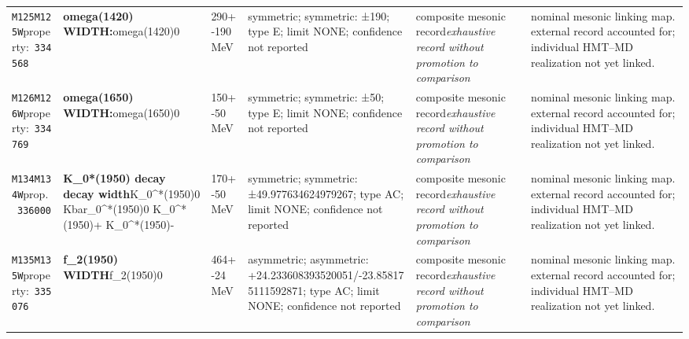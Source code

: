 \begin{landscape}
\begin{longtable}{L{1.85cm}L{4.45cm}L{2.35cm}L{4.05cm}L{3.35cm}L{7.15cm}}
\texttt{M125}\newline \texttt{M125W}\newline property:\ \texttt{334568} & \textbf{omega(1420) WIDTH:}\newline omega(1420)0 & 290+-190\,MeV & symmetric; symmetric: ±190; type E; limit NONE; confidence not reported & composite mesonic record\newline \emph{exhaustive record without promotion to comparison} & nominal mesonic linking map. external record accounted for; individual HMT--MD realization not yet linked. \\
\texttt{M126}\newline \texttt{M126W}\newline property:\ \texttt{334769} & \textbf{omega(1650) WIDTH:}\newline omega(1650)0 & 150+-50\,MeV & symmetric; symmetric: ±50; type E; limit NONE; confidence not reported & composite mesonic record\newline \emph{exhaustive record without promotion to comparison} & nominal mesonic linking map. external record accounted for; individual HMT--MD realization not yet linked. \\
\texttt{M134}\newline \texttt{M134W}\newline prop.\ \texttt{336000} & \textbf{K\_\allowbreak{}0*(1950) decay decay width}\newline K\_\allowbreak{}0\textasciicircum{}*(1950)0 \textbar{}\allowbreak{} Kbar\_\allowbreak{}0\textasciicircum{}*(1950)0 \textbar{}\allowbreak{} K\_\allowbreak{}0\textasciicircum{}*(1950)+ \textbar{}\allowbreak{} K\_\allowbreak{}0\textasciicircum{}*(1950)- & 170+-50\,MeV & symmetric; symmetric: ±49.977634624979267; type AC; limit NONE; confidence not reported & composite mesonic record\newline \emph{exhaustive record without promotion to comparison} & nominal mesonic linking map. external record accounted for; individual HMT--MD realization not yet linked. \\
\texttt{M135}\newline \texttt{M135W}\newline property:\ \texttt{335076} & \textbf{f\_\allowbreak{}2(1950) WIDTH}\newline f\_\allowbreak{}2(1950)0 & 464+-24\,MeV & asymmetric; asymmetric: +24.233608393520051/-23.858175111592871; type AC; limit NONE; confidence not reported & composite mesonic record\newline \emph{exhaustive record without promotion to comparison} & nominal mesonic linking map. external record accounted for; individual HMT--MD realization not yet linked. \\

\end{longtable}
\end{landscape}

